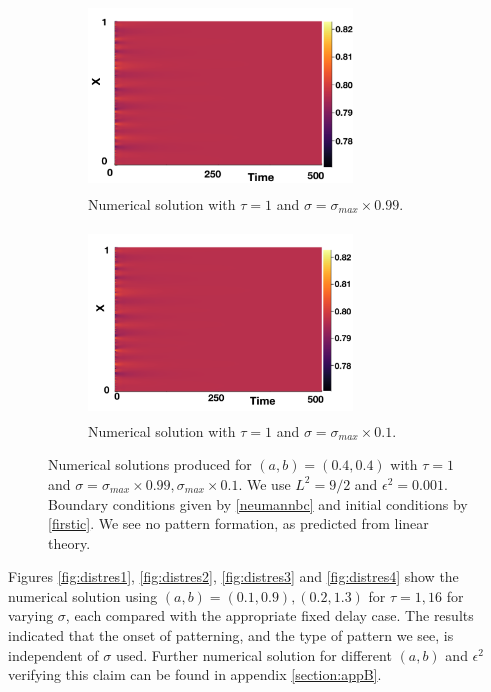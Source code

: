 \begin{figure}[H]
    \centering
    \begin{subfigure}[t]{0.45\textwidth}
        \centering
        \includegraphics[width=7cm,height=5cm]{distp2sig1.png}
        \caption{Numerical solution with $\tau=1$ and $\sigma=\sigma_{max}\times0.99$.}
        \label{}
    \end{subfigure}
    \hfill
    \begin{subfigure}[t]{0.45\textwidth}
        \centering
        \includegraphics[width=7cm,height=5cm]{distp2sig2.png}
        \caption{Numerical solution with $\tau=1$ and $\sigma=\sigma_{max}\times0.1$.}
        \label{}
    \end{subfigure}
    \caption{Numerical solutions produced for $(a,b)=(0.4,0.4)$ with $\tau=1$ and $\sigma=\sigma_{max}\times0.99, \sigma_{max}\times0.1$. We use $L^2=9/2$ and $\epsilon^2=0.001$. Boundary conditions given by \eqref{neumannbc} and initial conditions by \eqref{firstic}. We see no pattern formation, as predicted from linear theory.}
    \label{fig:testdist2}
\end{figure}
Figures \ref{fig:distres1}, \ref{fig:distres2}, \ref{fig:distres3} and \ref{fig:distres4} show the numerical solution using $(a,b)=(0.1,0.9),(0.2,1.3)$ for $\tau=1,16$ for varying $\sigma$, each compared with the appropriate fixed delay case. The results indicated that the onset of patterning, and the type of pattern we see, is independent of $\sigma$ used. Further numerical solution for different $(a,b)$ and $\epsilon^2$ verifying this claim can be found in appendix \ref{section:appB}.

